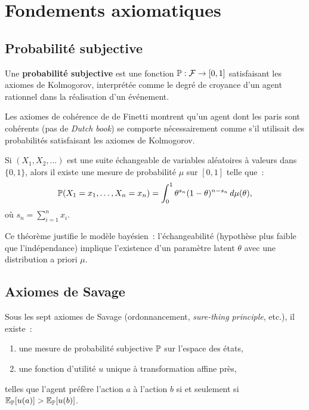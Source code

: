 \section{Fondements axiomatiques}

\subsection{Probabilit\'e subjective}

\begin{definition}
Une \textbf{probabilit\'e subjective} est une fonction
$\mathbb{P} : \mathcal{F} \to [0,1]$ satisfaisant les axiomes de Kolmogorov,
interpr\'et\'ee comme le degr\'e de croyance d'un agent rationnel dans
la r\'ealisation d'un \'ev\'enement.
\end{definition}

Les axiomes de coh\'erence de de Finetti montrent qu'un agent dont les
paris sont coh\'erents (pas de \textit{Dutch book}) se comporte
n\'ecessairement comme s'il utilisait des probabilit\'es satisfaisant
les axiomes de Kolmogorov.

\begin{theoreme}
Si $(X_1, X_2, \ldots)$ est une suite \'echangeable de variables
al\'eatoires \`a valeurs dans $\{0,1\}$, alors il existe une mesure de
probabilit\'e $\mu$ sur $[0,1]$ telle que~:
\[
  \mathbb{P}(X_1 = x_1, \ldots, X_n = x_n)
  = \int_0^1 \theta^{s_n}(1-\theta)^{n - s_n}\,d\mu(\theta),
\]
o\`u $s_n = \sum_{i=1}^n x_i$.
\end{theoreme}

\begin{remarque}
Ce th\'eor\`eme justifie le mod\`ele bay\'esien~: l'\'echangeabilit\'e
(hypoth\`ese plus faible que l'ind\'ependance) implique l'existence
d'un param\`etre latent $\theta$ avec une distribution a priori $\mu$.
\end{remarque}

\subsection{Axiomes de Savage}

\begin{theoreme}
Sous les sept axiomes de Savage (ordonnancement, \textit{sure-thing
principle}, etc.), il existe~:
\begin{enumerate}
  \item une mesure de probabilit\'e subjective $\mathbb{P}$ sur l'espace des
        \'etats,
  \item une fonction d'utilit\'e $u$ unique \`a transformation affine
        pr\`es,
\end{enumerate}
telles que l'agent pr\'ef\`ere l'action $a$ \`a l'action $b$ si et
seulement si $\mathbb{E}_{\mathbb{P}}[u(a)] > \mathbb{E}_{\mathbb{P}}[u(b)]$.
\end{theoreme}

